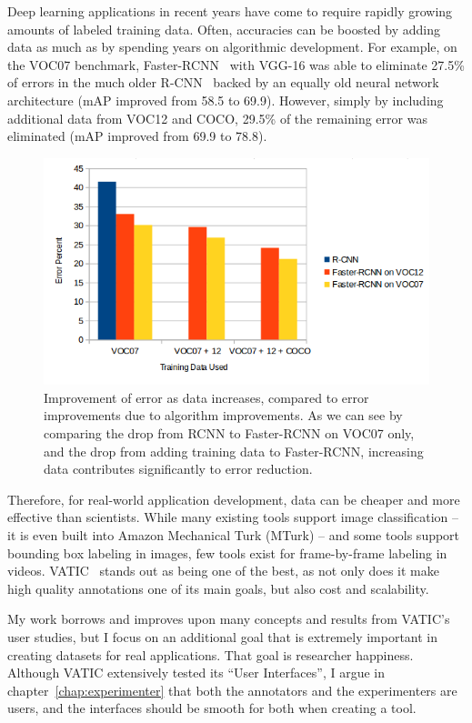 Deep learning applications in recent years have come to require rapidly growing amounts of labeled training data.
Often, accuracies can be boosted by adding data as much as by spending years on algorithmic development.
For example, on the VOC07 benchmark, Faster-RCNN~\cite{FasterRCNN} with VGG-16 was able to eliminate 27.5\% of errors in the much older R-CNN~\cite{RCNN} backed by an equally old neural network architecture (mAP improved from 58.5 to 69.9). 
However, simply by including additional data from VOC12 and COCO, 29.5\% of the remaining error was eliminated (mAP improved from 69.9 to 78.8). 

\begin{figure}[h]
\includegraphics[width=14cm]{figs/data_vs_error.png}
\centering
\caption{Improvement of error as data increases, compared to error improvements due to algorithm improvements. 
As we can see by comparing the drop from RCNN to Faster-RCNN on VOC07 only, and the drop from adding training data to Faster-RCNN, increasing data contributes significantly to error reduction.}
\end{figure}

Therefore, for real-world application development, data can be cheaper and more effective than scientists. 
While many existing tools support image classification -- it is even built into Amazon Mechanical Turk (MTurk) -- and some tools support bounding box labeling in images, few tools exist for frame-by-frame labeling in videos. 
VATIC~\cite{Vatic} stands out as being one of the best, as not only does it make high quality annotations one of its main goals, but also cost and scalability. 

My work borrows and improves upon many concepts and results from VATIC's user studies, but I focus on an additional goal that is extremely important in creating datasets for real applications. That goal is researcher happiness.
Although VATIC extensively tested its ``User Interfaces'', I argue in chapter~\ref{chap:experimenter} that both the annotators and the experimenters are users, and the interfaces should be smooth for both when creating a tool.

